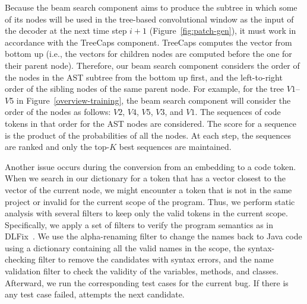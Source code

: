 Because the beam search component aims to produce the subtree
in which some of its nodes will be used in the tree-based convolutional
window as the input of the decoder at the next time step $i+1$
(Figure~\ref{fig:patch-gen}), it must work in accordance with the
TreeCaps component. TreeCaps computes the vector from bottom up (i.e.,
the vectors for children nodes are computed before the one for their
parent node). Therefore, our beam search component considers the order
of the nodes in the AST subtree from the bottom up first, and the
left-to-right order of the sibling nodes of the same parent node. For
example, for the tree $V1$--$V5$ in Figure~\ref{overview-training},
the beam search component will consider the order of the nodes as
follows: $V2$, $V4$, $V5$, $V3$, and $V1$. The sequences of code
tokens in that order for the AST nodes are considered. The score for a
sequence is the product of the probabilities of all the nodes. At each
step, the sequences are ranked and only the top-$K$ best sequences are
maintained.

Another issue occurs during the conversion from an embedding to a code
token. When we search in our dictionary for a token that has a vector
closest to the vector of the current node, we
might encounter a token that is not in the same project or invalid for
the current scope of the program. Thus, we perform static analysis
with several filters to keep only the valid tokens in the current
scope. Specifically, we apply a set of filters to verify the program
semantics as in DLFix~\cite{icse20}. We use the alpha-renaming filter
to change the names back to Java code using a dictionary
containing all the valid names in the scope, the syntax-checking
filter to remove the candidates with syntax errors, and the name
validation filter to check the validity of the variables, methods, and
classes.
Afterward, we run the corresponding test cases for the current
bug. If there is any test case failed, {\tool} attempts the next
candidate.


